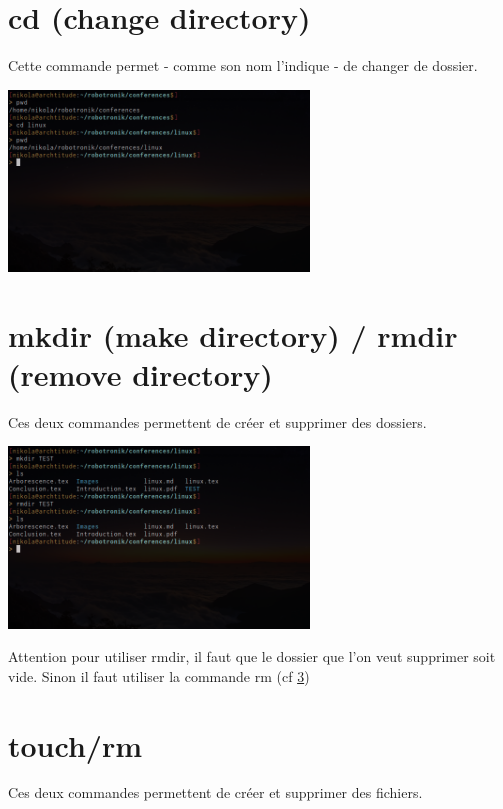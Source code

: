 \section{cd (change directory)}
Cette commande permet - comme son nom l'indique - de changer de dossier.

\begin{center}
	\includegraphics[width=0.6\textwidth]{Images/cd.png}
\end{center}

\section{mkdir (make directory) / rmdir (remove directory)}
Ces deux commandes permettent de créer et supprimer des dossiers.

\begin{center}
	\includegraphics[width=0.6\textwidth]{Images/dir.png}
\end{center}

Attention pour utiliser rmdir, il faut que le dossier que l'on veut supprimer soit vide. Sinon il faut utiliser la commande rm (cf \ref{sec:touch-rm})

\section{touch/rm}\label{sec:touch-rm}
Ces deux commandes permettent de créer et supprimer des fichiers. 

